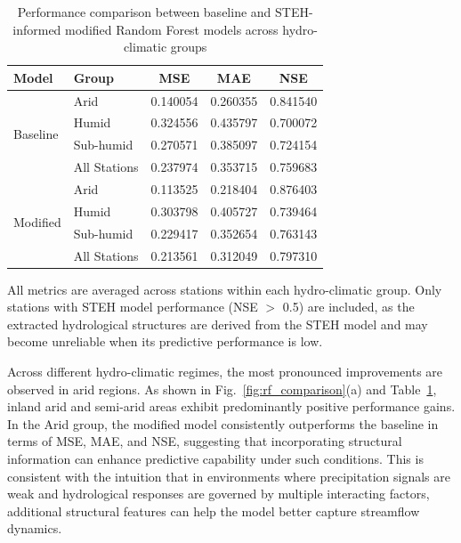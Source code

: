 \begin{table}[htbp]
    \centering
    \begin{threeparttable}
        \caption{Performance comparison between baseline and STEH-informed modified Random Forest models across hydro-climatic groups}
        \begin{tabular*}{\textwidth}{@{\extracolsep{\fill}}llccc}
            \toprule
            Model & Group & MSE & MAE & NSE \\
            \midrule

            \multirow{4}{*}{Baseline}
            & Arid          & 0.140054 & 0.260355 & 0.841540 \\
            & Humid         & 0.324556 & 0.435797 & 0.700072 \\
            & Sub-humid     & 0.270571 & 0.385097 & 0.724154 \\
            & All Stations  & 0.237974 & 0.353715 & 0.759683 \\

            \midrule

            \multirow{4}{*}{Modified}
            & Arid          & 0.113525 & 0.218404 & 0.876403 \\
            & Humid         & 0.303798 & 0.405727 & 0.739464 \\
            & Sub-humid     & 0.229417 & 0.352654 & 0.763143 \\
            & All Stations  & 0.213561 & 0.312049 & 0.797310 \\

            \bottomrule
        \end{tabular*}

        \begin{tablenotes}
            \footnotesize
            \item All metrics are averaged across stations within each hydro-climatic group. Only stations with STEH model performance (NSE $>$ 0.5) are included, as the extracted hydrological structures are derived from the STEH model and may become unreliable when its predictive performance is low.
        \end{tablenotes}

        \label{tab:rf_performance}
    \end{threeparttable}
\end{table}

Across different hydro-climatic regimes, the most pronounced improvements are observed in arid regions. As shown in Fig.~\ref{fig:rf_comparison}(a) and Table~\ref{tab:rf_performance}, inland arid and semi-arid areas exhibit predominantly positive performance gains. In the Arid group, the modified model consistently outperforms the baseline in terms of MSE, MAE, and NSE, suggesting that incorporating structural information can enhance predictive capability under such conditions. This is consistent with the intuition that in environments where precipitation signals are weak and hydrological responses are governed by multiple interacting factors\cite{TAKEFUJI2025123514}, additional structural features can help the model better capture streamflow dynamics.

